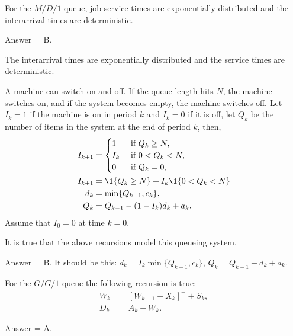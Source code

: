 \begin{exercise}[201703]
 For the $M/D/1$ queue, job service times are exponentially
 distributed and the interarrival times are deterministic.

\begin{solution}
 Answer = B.

 The interarrival times are exponentially distributed and the
 service times are deterministic.
\end{solution}
\end{exercise}

\begin{exercise}[201703] 
A machine can switch on and off. If the queue length
 hits $N$, the machine switches on, and if the system becomes empty,
 the machine switches off. Let $I_k=1$ if the machine is on in
 period $k$ and $I_k=0$ if it is off, let $Q_k$ be the number of
 items in the system at the end of period $k$, then, 
 \begin{align*}
 I_{k+1} &=
 \begin{cases}
 1 & \text{ if } Q_{k} \geq N,\\
 I_k & \text{ if } 0< Q_{k} <N,\\
 0 & \text{ if } Q_{k} =0,\\
 \end{cases}\\
 I_{k+1} &= \1{Q_k\geq N} + I_k \1{0<Q_k<N} \\
d_k &=\min\{Q_{k-1}, c_k\}, \\
Q_k &= Q_{k-1} - (1-I_k) d_k + a_k.
 \end{align*}
 Assume that $I_0 =0$ at time $k=0$. 

It is true that the above
 recursions model this queueing system.

\begin{solution}
 Answer = B.
It should be this: $d_k =I_k \min\{Q_{k-1}, c_k\}$, $Q_k = Q_{k-1} - d_k + a_k$.

\end{solution}
\end{exercise}


\begin{exercise}[201703]
For the $G/G/1$ queue the following recursion is true: 
\begin{align*}
 W_{k} &= [W_{k-1} - X_k]^+ + S_k,\\
 D_k &= A_k + W_k.
\end{align*}

\begin{solution}
 Answer = A.
\end{solution}
\end{exercise}

